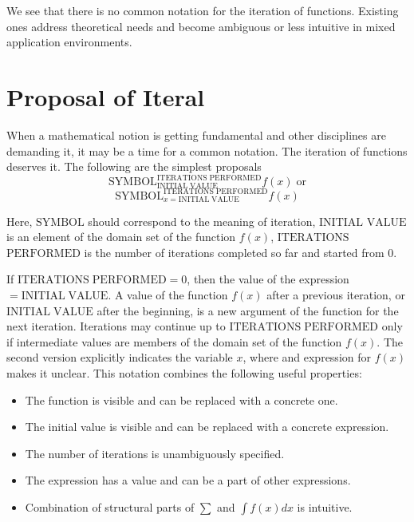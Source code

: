 \documentclass{article}
\begin{document}
We see that there is no common notation for the iteration of functions. Existing ones address theoretical needs and become ambiguous or less intuitive in mixed application environments.

\section{Proposal of Iteral}

When a mathematical notion is getting fundamental and other disciplines are demanding it, it may be a time for a common notation. The iteration of functions deserves it. The following are the simplest proposals
\begin{displaymath}
\mathrm{SYMBOL}_\mathrm{INITIAL \; VALUE}^\mathrm{ITERATIONS \; PERFORMED}f(x) \; \textrm{or}
\end{displaymath}
\begin{displaymath}
\mathrm{SYMBOL}_{x=\mathrm{INITIAL \; VALUE}}^\mathrm{ITERATIONS \; PERFORMED}f(x)
\end{displaymath}

Here, $\mathrm{SYMBOL}$ should correspond to the meaning of iteration, $\mathrm{INITIAL}$ $\mathrm{VALUE}$ is an element of the domain set of the function $f(x)$, $\mathrm{ITERATIONS}$ $\mathrm{PERFORMED}$ is the number of iterations completed so far and started from 0.

If $\mathrm{ITERATIONS \; PERFORMED} = 0$, then the value of the expression $= \mathrm{INITIAL \; VALUE}$. A value of the function $f(x)$ after a previous iteration, or $ \mathrm{INITIAL \; VALUE}$ after the beginning, is a new argument of the function for the next iteration. Iterations may continue up to $\mathrm{ITERATIONS \; PERFORMED}$ only if intermediate values are members of the domain set of the function $f(x)$. The second version explicitly indicates the variable $x$, where and expression for $f(x)$ makes it unclear.  This notation combines the following useful properties:

\begin{itemize}
\item The function is visible and can be replaced with a concrete one.
\item The initial value is visible and can be replaced with a concrete expression.
\item The number of iterations is unambiguously specified.
\item The expression has a value and can be a part of other expressions.
\item Combination of structural parts of $\sum$ and $\int f(x)dx$ is intuitive.
\end{itemize}
\end{document}
